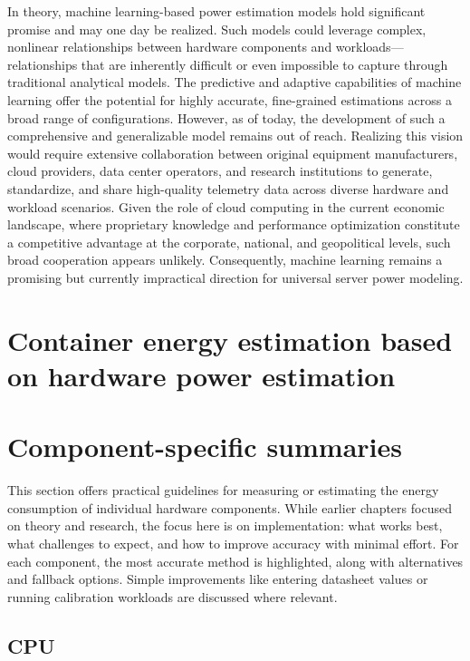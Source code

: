 In theory, machine learning-based power estimation models hold significant promise and may one day be realized. Such models could leverage complex, nonlinear relationships between hardware components and workloads—relationships that are inherently difficult or even impossible to capture through traditional analytical models. The predictive and adaptive capabilities of machine learning offer the potential for highly accurate, fine-grained estimations across a broad range of configurations. However, as of today, the development of such a comprehensive and generalizable model remains out of reach. Realizing this vision would require extensive collaboration between original equipment manufacturers, cloud providers, data center operators, and research institutions to generate, standardize, and share high-quality telemetry data across diverse hardware and workload scenarios. Given the role of cloud computing in the current economic landscape, where proprietary knowledge and performance optimization constitute a competitive advantage at the corporate, national, and geopolitical levels, such broad cooperation appears unlikely. Consequently, machine learning remains a promising but currently impractical direction for universal server power modeling.



\section{Container energy estimation based on hardware power estimation}


\section{Component-specific summaries}
\label{sec:component_specific_summaries}

This section offers practical guidelines for measuring or estimating the energy consumption of individual hardware components. While earlier chapters focused on theory and research, the focus here is on implementation: what works best, what challenges to expect, and how to improve accuracy with minimal effort. For each component, the most accurate method is highlighted, along with alternatives and fallback options. Simple improvements like entering datasheet values or running calibration workloads are discussed where relevant.

\subsection{CPU}

